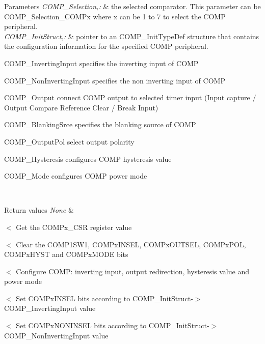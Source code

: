\begin{DoxyParams}{Parameters}
{\em C\-O\-M\-P\-\_\-\-Selection,\-:} & the selected comparator. This parameter can be C\-O\-M\-P\-\_\-\-Selection\-\_\-\-C\-O\-M\-Px where x can be 1 to 7 to select the C\-O\-M\-P peripheral. \\
\hline
{\em C\-O\-M\-P\-\_\-\-Init\-Struct,\-:} & pointer to an C\-O\-M\-P\-\_\-\-Init\-Type\-Def structure that contains the configuration information for the specified C\-O\-M\-P peripheral.
\begin{DoxyItemize}
\item C\-O\-M\-P\-\_\-\-Inverting\-Input specifies the inverting input of C\-O\-M\-P
\item C\-O\-M\-P\-\_\-\-Non\-Inverting\-Input specifies the non inverting input of C\-O\-M\-P
\item C\-O\-M\-P\-\_\-\-Output connect C\-O\-M\-P output to selected timer input (Input capture / Output Compare Reference Clear / Break Input)
\item C\-O\-M\-P\-\_\-\-Blanking\-Srce specifies the blanking source of C\-O\-M\-P
\item C\-O\-M\-P\-\_\-\-Output\-Pol select output polarity
\item C\-O\-M\-P\-\_\-\-Hysteresis configures C\-O\-M\-P hysteresis value
\item C\-O\-M\-P\-\_\-\-Mode configures C\-O\-M\-P power mode 
\end{DoxyItemize}\\
\hline
\end{DoxyParams}

\begin{DoxyRetVals}{Return values}
{\em None} & \\
\hline
\end{DoxyRetVals}
$<$ Get the C\-O\-M\-Px\-\_\-\-C\-S\-R register value

$<$ Clear the C\-O\-M\-P1\-S\-W1, C\-O\-M\-Px\-I\-N\-S\-E\-L, C\-O\-M\-Px\-O\-U\-T\-S\-E\-L, C\-O\-M\-Px\-P\-O\-L, C\-O\-M\-Px\-H\-Y\-S\-T and C\-O\-M\-Px\-M\-O\-D\-E bits

$<$ Configure C\-O\-M\-P\-: inverting input, output redirection, hysteresis value and power mode

$<$ Set C\-O\-M\-Px\-I\-N\-S\-E\-L bits according to C\-O\-M\-P\-\_\-\-Init\-Struct-\/$>$C\-O\-M\-P\-\_\-\-Inverting\-Input value

$<$ Set C\-O\-M\-Px\-N\-O\-N\-I\-N\-S\-E\-L bits according to C\-O\-M\-P\-\_\-\-Init\-Struct-\/$>$C\-O\-M\-P\-\_\-\-Non\-Inverting\-Input value

